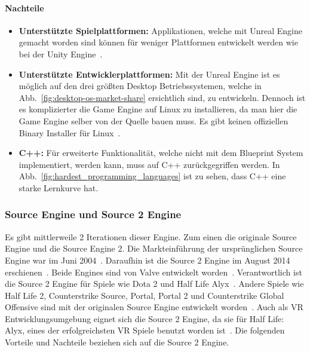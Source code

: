 \paragraph{Nachteile}

\begin{itemize}
    \item \textbf{Unterstützte Spielplattformen:} Applikationen, welche mit Unreal Engine gemacht worden sind können für weniger Plattformen entwickelt werden wie bei der Unity Engine~\cite{Viscirele_Unreal_v_Unity}.
    \item \textbf{Unterstützte Entwicklerplattformen:} Mit der Unreal Engine ist es möglich auf den drei größten Desktop Betriebssystemen, welche in Abb.~\ref{fig:desktop-os-market-share} ersichtlich sind, zu entwickeln.
    Dennoch ist es komplizierter die Game Engine auf Linux zu installieren, da man hier die Game Engine selber von der Quelle bauen muss.
    Es gibt keinen offiziellen Binary Installer für Linux~\cite{Unreal_Installationsguide}.
    \item \textbf{C++:} Für erweiterte Funktionalität, welche nicht mit dem Blueprint System implementiert, werden kann, muss auf C++ zurückgegriffen werden.
    In Abb.~\ref{fig:hardest_programming_languages} ist zu sehen, dass C++ eine starke Lernkurve hat.
\end{itemize}

\subsubsection{Source Engine und Source 2 Engine}

Es gibt mittlerweile 2 Iterationen dieser Engine.
Zum einen die originale Source Engine und die Source Engine 2.
Die Markteinführung der ursprünglichen Source Engine war im Juni 2004~\cite{Bryan_Wirtz_SOURCE_ENGINE_2022}.
Daraufhin ist die Source 2 Engine im August 2014 erschienen~\cite{VALVE_DEVELOPER_COMMUNITY_SOURCE2}.
Beide Engines sind von Valve entwickelt worden~\cite{VALVE_DEVELOPER_COMMUNITY_SOURCE, VALVE_DEVELOPER_COMMUNITY_SOURCE2}.
Verantwortlich ist die Source 2 Engine für Spiele wie Dota 2 und Half Life Alyx~\cite{WIKIPEDIA_SOURCE2_ENGINE_GAME_LIST}.
Andere Spiele wie Half Life 2, Counterstrike Source, Portal, Portal 2 und Counterstrike Global Offensive sind mit der originalen Source Engine entwickelt worden~\cite{WIKIPEDIA_SOURCE_ENGINE_GAME_LIST}.
Auch als VR Entwicklungsumgebung eignet sich die Source 2 Engine, da sie für Half Life: Alyx, eines der erfolgreichsten VR Spiele benutzt worden ist~\cite{WIKIPEDIA_SOURCE2_ENGINE_GAME_LIST, Aden_Carter_2020}.
Die folgenden Vorteile und Nachteile beziehen sich auf die Source 2 Engine.

